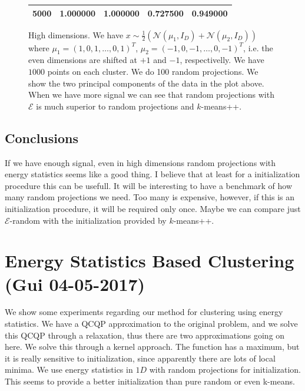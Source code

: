 \documentclass[aps,preprint,nofootinbib,floatfix]{revtex4-1}
\begin{document}
\begin{figure}
\begin{minipage}{.5\textwidth}
\begin{tabular}{l l l l l}
5000 & 1.000000 & 1.000000 & 0.727500 & 0.949000 \\
%
\hline
\end{tabular}
\end{minipage}
\caption{\label{fig:highd}
High dimensions.
We have $x \sim \tfrac{1}{2}\left( \mathcal{N}(\mu_1, I_D) +
\mathcal{N}(\mu_2, I_D)\right)$ where 
$\mu_1 = (1,0,1,\dotsc,0,1)^T$,
$\mu_2 = (-1,0,-1,\dotsc,0,-1)^T$, i.e. the even dimensions are
shifted at $+1$ and $-1$, respectivelly.
We have $1000$ points on each cluster. We do 100 random projections.
We show the two principal components
of the data in the plot above. When we have more signal we can see that
random projections with $\mathcal{E}$ is much superior to random projections
and $k$-means++.
}
\end{figure}


\subsection{Conclusions}
If we have enough signal, even in high dimensions random projections with
energy statistics seems like a good thing. I believe that at least for
a initialization procedure this can be usefull. It will be interesting to
have a benchmark of how many random projections we need. Too many is expensive,
however, if this is an initialization procedure, it will be required only
once. Maybe we can compare just $\mathcal{E}$-random with the initialization
provided by $k$-means++.


\section{Energy Statistics Based Clustering (Gui 04-05-2017)}


We show some experiments regarding our method for clustering using energy
statistics. We have a QCQP approximation to the original problem, and we solve
this QCQP through a relaxation, thus there are two approximations going on
here. We solve this through a kernel approach. The function has a maximum, but
it is really sensitive to initialization, since apparently there are lots of
local minima. We use energy statistics in $1D$ with random projections for
initialization. This seems to provide a better initialization than pure random
or even k-means.
\end{document}
